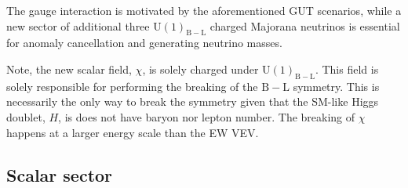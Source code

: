 \documentclass[10pt]{book}
\renewcommand{\(}{\left(}
\renewcommand{\)}{\right)}
\renewcommand{\[}{\left[}
\renewcommand{\]}{\right]}
\begin{document}
{ \color{gray} The gauge interaction is motivated by the aforementioned GUT scenarios, while a new sector of additional three $\mathrm{U(1)_{B-L}}$ charged Majorana neutrinos is essential for anomaly cancellation and generating neutrino masses.

Note, the new scalar field, $\chi$, is solely charged under $\mathrm{U(1)_{B-L}}$. This field is solely responsible for performing the breaking of the $\mathrm{B-L}$ symmetry. This is necessarily the only way to break the symmetry given that the SM-like Higgs doublet, $H$, is does not have baryon nor lepton number. The breaking of $\chi$ happens at a larger energy scale than the EW VEV. }


\subsection{Scalar sector}
\end{document}
